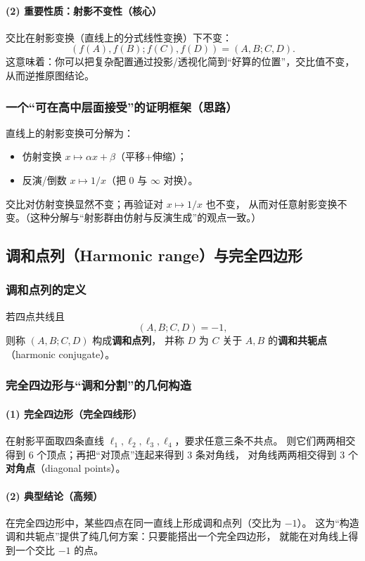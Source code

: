 \documentclass[UTF8]{ctexart}
\begin{document}
	\paragraph{(2) 重要性质：射影不变性（核心）}
	交比在射影变换（直线上的分式线性变换）下不变：
	\[
	(f(A),f(B);f(C),f(D))=(A,B;C,D).
	\]
	这意味着：你可以把复杂配置通过投影/透视化简到“好算的位置”，交比值不变，从而逆推原图结论。
	
	\subsubsection{一个“可在高中层面接受”的证明框架（思路）}
	直线上的射影变换可分解为：
	\begin{itemize}
		\item 仿射变换 $x\mapsto \alpha x+\beta$（平移+伸缩）；
		\item 反演/倒数 $x\mapsto 1/x$（把 0 与 $\infty$ 对换）。
	\end{itemize}
	交比对仿射变换显然不变；再验证对 $x\mapsto 1/x$ 也不变，
	从而对任意射影变换不变。（这种分解与“射影群由仿射与反演生成”的观点一致。）
	
	\subsection{调和点列（Harmonic range）与完全四边形}
	\subsubsection{调和点列的定义}
	若四点共线且
	\[
	(A,B;C,D)=-1,
	\]
	则称 $(A,B;C,D)$ 构成\textbf{调和点列}，
	并称 $D$ 为 $C$ 关于 $A,B$ 的\textbf{调和共轭点}（harmonic conjugate）。
	
	\subsubsection{完全四边形与“调和分割”的几何构造}
	\paragraph{(1) 完全四边形（完全四线形）}
	在射影平面取四条直线 $\ell_1,\ell_2,\ell_3,\ell_4$，要求任意三条不共点。
	则它们两两相交得到 $6$ 个顶点；再把“对顶点”连起来得到 $3$ 条对角线，
	对角线两两相交得到 $3$ 个\textbf{对角点}（diagonal points）。
	
	\paragraph{(2) 典型结论（高频）}
	在完全四边形中，某些四点在同一直线上形成调和点列（交比为 $-1$）。
	这为“构造调和共轭点”提供了纯几何方案：只要能搭出一个完全四边形，
	就能在对角线上得到一个交比 $-1$ 的点。
	
\end{document}
